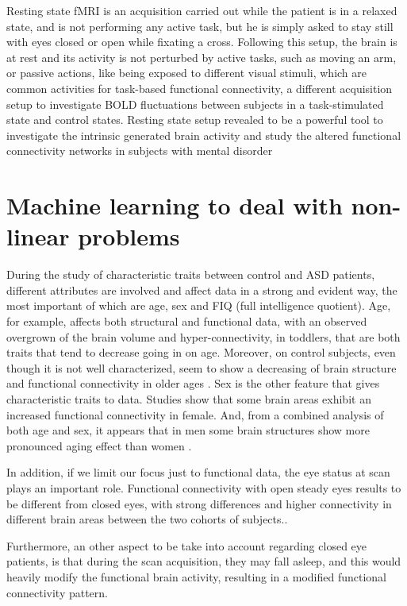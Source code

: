 \documentclass[11pt]{report}
\begin{document}
Resting state fMRI is an acquisition carried out while the patient is in a relaxed state, and is not performing any active task, but he is simply asked to stay still with eyes closed or open while fixating a cross.
Following this setup, the brain is at rest and its activity is not perturbed by active tasks, such as moving an arm, or passive actions, like being exposed to different visual stimuli, which are common activities for task-based functional connectivity, a different acquisition setup to investigate BOLD fluctuations between subjects in a task-stimulated state and control states.
Resting state setup revealed to be a powerful tool to investigate the intrinsic generated brain activity and study the altered functional connectivity networks in subjects with mental disorder

\section{Machine learning to deal with non-linear problems}\label{sec:intro_ml}
During the study of characteristic traits between control and ASD patients, different attributes are involved and affect data in a strong and evident way, the most important of which are age, sex and FIQ (full intelligence quotient).
Age, for example, affects both structural and functional data, with an observed overgrown of the brain volume and hyper-connectivity, in toddlers, that are both traits that tend to decrease going in on age.
Moreover, on control subjects, even though it is not well characterized, seem to show a decreasing of brain structure and functional connectivity in older ages \cite{zhangC-2016}.
Sex is the other feature that gives characteristic traits to data.
Studies show that some brain areas exhibit an increased functional connectivity in female.
And, from a combined analysis of both age and sex, it appears that in men some brain structures show more pronounced aging effect than women \cite{coffey-1998}.

In addition, if we limit our focus just to functional data, the eye status at scan plays an important role.
Functional connectivity with open steady eyes results to be different from closed eyes, with strong differences and higher connectivity in different brain areas between the two cohorts of subjects.\cite{costumero-2020}.

Furthermore, an other aspect to be take into account regarding closed eye patients, is that during the scan acquisition, they may fall asleep, and this would heavily modify the functional brain activity, resulting in a modified functional connectivity pattern.
\end{document}

